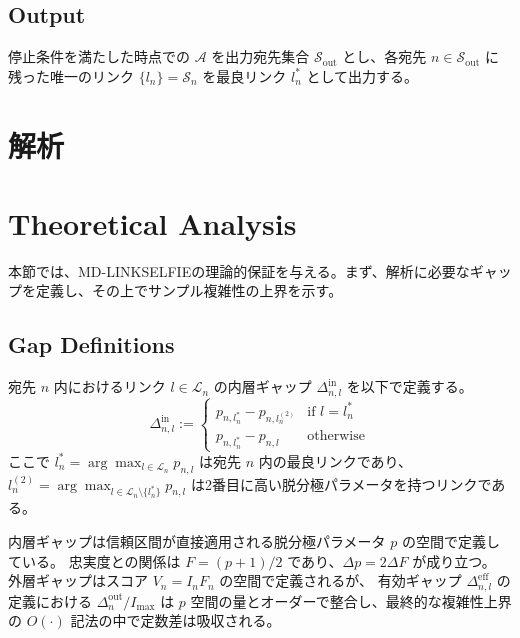 \documentclass[conference]{IEEEtran}
\begin{document}
\subsection{Output}
停止条件を満たした時点での $\mathcal{A}$ を出力宛先集合 $\mathcal{S}_{\mathrm{out}}$ とし、各宛先 $n \in \mathcal{S}_{\mathrm{out}}$ に残った唯一のリンク $\{l_n\} = \mathcal{S}_n$ を最良リンク $l_n^*$ として出力する。

\section*{解析}
\label{sec:orgfb3b418}


\section{Theoretical Analysis}

本節では、MD-LINKSELFIEの理論的保証を与える。まず、解析に必要なギャップを定義し、その上でサンプル複雑性の上界を示す。

\subsection{Gap Definitions}

\begin{definition}
宛先 $n$ 内におけるリンク $l \in \mathcal{L}_n$ の内層ギャップ $\Delta_{n,l}^{\mathrm{in}}$ を以下で定義する。
\begin{equation}
    \Delta_{n,l}^{\mathrm{in}} := \begin{cases} p_{n,l_n^*} - p_{n,l_n^{(2)}} & \text{if } l = l_n^* \\ p_{n,l_n^*} - p_{n,l} & \text{otherwise} \end{cases}
\end{equation}
ここで $l_n^* = \arg\max_{l \in \mathcal{L}_n} p_{n,l}$ は宛先 $n$ 内の最良リンクであり、$l_n^{(2)} = \arg\max_{l \in \mathcal{L}_n \setminus \{l_n^*\}} p_{n,l}$ は2番目に高い脱分極パラメータを持つリンクである。
\end{definition}

\begin{remark}
内層ギャップは信頼区間が直接適用される脱分極パラメータ $p$ の空間で定義している。
忠実度との関係は $F = (p+1)/2$ であり、$\Delta p = 2 \Delta F$ が成り立つ。
外層ギャップはスコア $V_n = I_n F_n$ の空間で定義されるが、
有効ギャップ $\Delta_{n,l}^{\mathrm{eff}}$ の定義における $\Delta_n^{\mathrm{out}} / I_{\max}$
は $p$ 空間の量とオーダーで整合し、最終的な複雑性上界の $O(\cdot)$ 記法の中で定数差は吸収される。
\end{remark}
\end{document}
